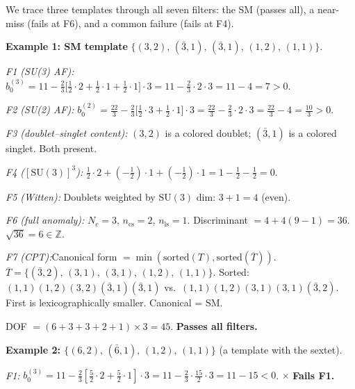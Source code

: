 \documentclass[11pt]{article}
\theoremstyle{definition}
\newcommand{\SU}{\mathrm{SU}}
\begin{document}
We trace three templates through all seven filters: the SM (passes
all), a near-miss (fails at F6), and a common failure (fails at F4).

\smallskip\noindent\textbf{Example 1: SM template}
$\{(3,2),\, (\bar{3},1),\, (\bar{3},1),\, (1,2),\, (1,1)\}$.

\smallskip\noindent\textit{F1 (SU(3) AF):}\quad
$b_0^{(3)} = 11 - \tfrac{2}{3}\bigl[\tfrac{1}{2}\!\cdot\!2 +
\tfrac{1}{2}\!\cdot\!1 + \tfrac{1}{2}\!\cdot\!1\bigr]\!\cdot\!3
= 11 - \tfrac{2}{3}\!\cdot\!2\!\cdot\!3 = 11 - 4 = 7 > 0$.  \checkmark

\smallskip\noindent\textit{F2 (SU(2) AF):}\quad
$b_0^{(2)} = \tfrac{22}{3} - \tfrac{2}{3}\bigl[\tfrac{1}{2}\!\cdot\!3
+ \tfrac{1}{2}\!\cdot\!1\bigr]\!\cdot\!3
= \tfrac{22}{3} - \tfrac{2}{3}\!\cdot\!2\!\cdot\!3 = \tfrac{22}{3} - 4
= \tfrac{10}{3} > 0$.  \checkmark

\smallskip\noindent\textit{F3 (doublet--singlet content):}\quad
$(3,2)$ is a colored doublet; $(\bar{3},1)$ is a colored singlet.
Both present.  \checkmark

\smallskip\noindent\textit{F4 ($[\SU(3)]^3$):}\quad
$\tfrac{1}{2}\!\cdot\!2 + (-\tfrac{1}{2})\!\cdot\!1
+ (-\tfrac{1}{2})\!\cdot\!1 = 1 - \tfrac{1}{2} - \tfrac{1}{2} = 0$.
\checkmark

\smallskip\noindent\textit{F5 (Witten):}\quad
Doublets weighted by $\SU(3)$ dim: $3 + 1 = 4$ (even).  \checkmark

\smallskip\noindent\textit{F6 (full anomaly):}\quad
$N_c = 3$, $n_{\mathrm{cs}} = 2$, $n_{\mathrm{ls}} = 1$.
Discriminant $= 4 + 4(9-1) = 36$.  $\sqrt{36} = 6 \in \mathbb{Z}$.
\checkmark

\smallskip\noindent\textit{F7 (CPT):}\quad Canonical form
$= \min(\text{sorted}(T), \text{sorted}(\overline{T}))$.
$\overline{T} = \{(\bar{3},2),\, (3,1),\, (3,1),\, (1,2),\, (1,1)\}$.
Sorted: $(1,1)(1,2)(3,2)(\bar{3},1)(\bar{3},1)$ vs.\
$(1,1)(1,2)(3,1)(3,1)(\bar{3},2)$.  First is lexicographically
smaller.  Canonical = SM.  \checkmark

\smallskip\noindent DOF $= (6+3+3+2+1)\times 3 = 45$.
\textbf{Passes all filters.}

\bigskip
\noindent\textbf{Example 2: $\{(6,2),\, (\bar{6},1),\, (1,2),\, (1,1)\}$}
(a template with the sextet).

\smallskip\noindent\textit{F1:}\quad
$b_0^{(3)} = 11 - \tfrac{2}{3}[\tfrac{5}{2}\!\cdot\!2 +
\tfrac{5}{2}\!\cdot\!1]\!\cdot\!3 = 11 - \tfrac{2}{3}\!\cdot\!
\tfrac{15}{2}\!\cdot\!3 = 11 - 15 < 0$.  $\boldsymbol{\times}$ \textbf{Fails F1.}
\end{document}
